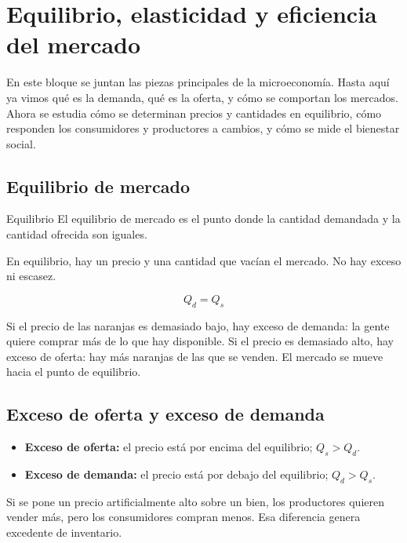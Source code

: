 \section{Equilibrio, elasticidad y eficiencia del mercado}
\label{sec:equilibrio-elasticidad-eficiencia}

En este bloque se juntan las piezas principales de la microeconomía. Hasta aquí ya vimos qué es la demanda, qué es la oferta, y cómo se comportan los mercados. Ahora se estudia cómo se determinan precios y cantidades en equilibrio, cómo responden los consumidores y productores a cambios, y cómo se mide el bienestar social.

\subsection{Equilibrio de mercado}

\begin{concepto}{Equilibrio}
El equilibrio de mercado es el punto donde la cantidad demandada y la cantidad ofrecida son iguales.
\end{concepto}

En equilibrio, hay un precio y una cantidad que vacían el mercado. No hay exceso ni escasez.

\begin{equation}
Q_d = Q_s
\end{equation}

\begin{ejemplo}
Si el precio de las naranjas es demasiado bajo, hay exceso de demanda: la gente quiere comprar más de lo que hay disponible. Si el precio es demasiado alto, hay exceso de oferta: hay más naranjas de las que se venden. El mercado se mueve hacia el punto de equilibrio.
\end{ejemplo}

\subsection{Exceso de oferta y exceso de demanda}

\begin{itemize}
    \item \textbf{Exceso de oferta:} el precio está por encima del equilibrio; $Q_s > Q_d$.
    \item \textbf{Exceso de demanda:} el precio está por debajo del equilibrio; $Q_d > Q_s$.
\end{itemize}

\begin{ejemplo}
Si se pone un precio artificialmente alto sobre un bien, los productores quieren vender más, pero los consumidores compran menos. Esa diferencia genera excedente de inventario.
\end{ejemplo}


